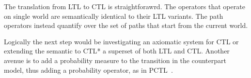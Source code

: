 The translation from \ac{LTL} to \ac{CTL} is straightforawrd. The operators that operate on single world are
semantically identical to their \ac{LTL} variants. The path operators instead quantify over the set of paths that start
from the current world.

Logically the next step would be investigating an axiomatic system for \ac{CTL} or extending the semantic to \ac{CTL}* a
superset of both \ac{LTL} and \ac{CTL}. Another avenue is to add a probability measure to the transition in the
counterpart model, thus adding a probability operator, as in \ac{PCTL}~\cite{brazdil_satisfiability_2008}.
